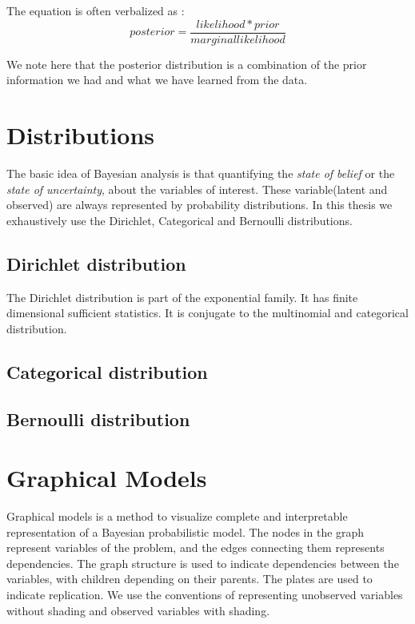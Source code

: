 The equation is often verbalized as :
\begin{equation}
	posterior = \frac{likelihood * prior}{marginal likelihood}
\end{equation}

We note here that the posterior distribution is a combination of the prior information we had and what we have learned from the data. 





\section{Distributions }

The basic idea of Bayesian analysis is that quantifying the \emph{state of belief} or the \emph{state of uncertainty}, about the variables of interest. These variable(latent and observed) are always represented by probability distributions. In this thesis we exhaustively use the Dirichlet, Categorical and Bernoulli distributions. 
 
\subsection*{Dirichlet distribution}
The Dirichlet distribution is part of the exponential family. It has finite dimensional sufficient statistics. It is conjugate to the multinomial and categorical distribution. 

\subsection*{Categorical distribution}

\subsection*{Bernoulli distribution}

\section{Graphical Models}
Graphical models is a method to visualize complete and interpretable representation of a Bayesian probabilistic model. The nodes in the graph represent variables of the problem, and the edges connecting them represents dependencies. The graph structure is used to indicate dependencies between the variables, with children depending on their parents. The plates are used to indicate replication. We use the conventions of representing unobserved variables without shading and observed variables with shading.

